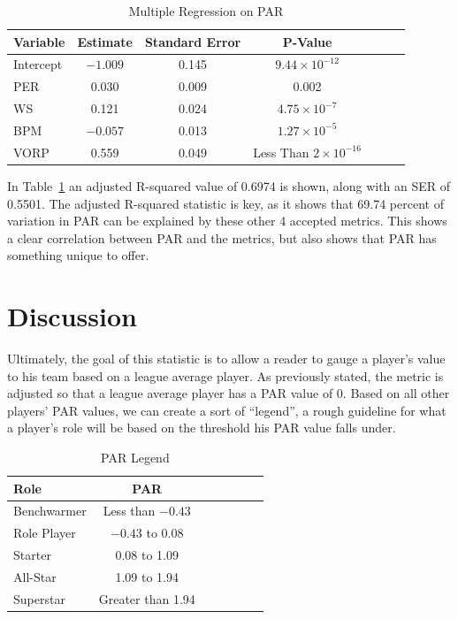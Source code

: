 \documentclass[12pt]{article}
\begin{document}
\begin{table}[H]
  \caption{Multiple Regression on PAR}
  \label{tab:MultipleRegression}
\centering
\begin{tabular}[t]{lcccccc}
  \toprule
  Variable &  Estimate & Standard Error & P-Value\\
  \midrule
Intercept & $-1.009$  & 0.145 & $9.44 \times 10^{-12}$\\
PER & 0.030 & 0.009 & 0.002\\
WS & 0.121 & 0.024 & $4.75 \times 10^{-7}$\\
BPM & $-0.057$ & 0.013 & $1.27 \times 10^{-5}$\\
VORP & 0.559 & 0.049 & Less Than $2 \times 10^{-16}$\\
  \bottomrule
\end{tabular}
\end{table}

In Table~\ref{tab:MultipleRegression} an adjusted R-squared value of 
0.6974 is shown, along with an SER of 0.5501. The adjusted R-squared
statistic is key, as it shows that 69.74 percent of variation 
in PAR can be explained by these other 4 accepted metrics. This shows a 
clear correlation between PAR 
and the metrics, but also shows that PAR has something unique to offer.




\section{Discussion}
Ultimately, the goal of this statistic is to allow a reader to gauge a player's 
value to his team based on a 
league average player. As previously stated, the metric is adjusted so that 
a league average player has a 
PAR value of 0. Based on all other players' PAR values, we can create a 
sort of ``legend'', a rough guideline 
for what a player's role will be based on the threshold his PAR value falls 
under.

\begin{table}[H]
  \caption{PAR Legend}
  \label{tab:PARLegend}
\centering
\begin{tabular}[t]{lcccccc}
  \toprule
  Role &  PAR\\
  \midrule
Benchwarmer & Less than $-0.43$\\
Role Player & $-0.43$ to 0.08\\
Starter & 0.08 to 1.09\\
All-Star & 1.09 to 1.94\\
Superstar & Greater than 1.94\\
  \bottomrule
\end{tabular}
\end{table}
\end{document}
